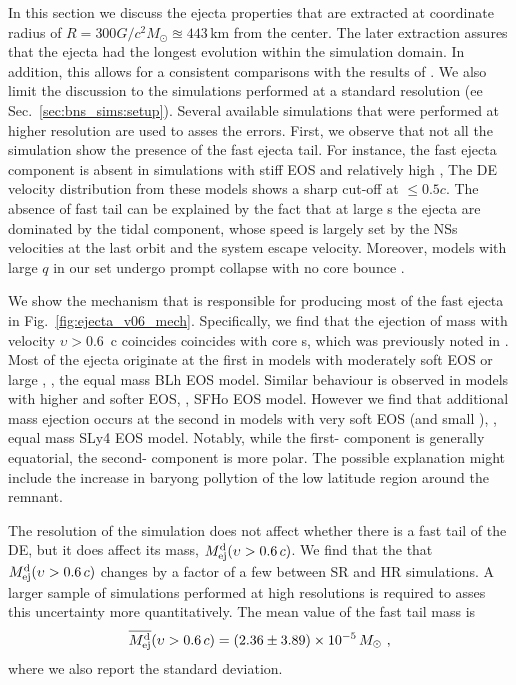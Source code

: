 In this section we discuss the ejecta properties that are extracted at 
coordinate radius of $R=300G/c^2M_{\odot}\approxeq443\,$km from the center.
The later extraction assures that the ejecta had the longest evolution 
within the simulation domain. In addition, this allows for a consistent
comparisons with the results of \citet{Radice:2018pdn}.
We also limit the discussion to the simulations performed at a standard resolution
(ee Sec.~\ref{sec:bns_sims:setup}). Several available simulations that 
were performed at higher resolution are used to asses the errors.
%
First, we observe that not all the simulation show the presence of the fast ejecta tail.
For instance, the fast ejecta component is absent in simulations with stiff \ac{EOS} 
and relatively high \mr{}, 
The \ac{DE} velocity distribution from these models shows a sharp cut-off at $\leq0.5c$.
The absence of fast tail can be explained by the fact that 
at large \mr{}s the ejecta are dominated by the tidal component, whose speed 
is largely set by the \acp{NS} velocities at the last orbit and the system escape velocity.
Moreover, models with large $q$ in our set undergo prompt collapse 
with no core bounce \citep{Bernuzzi:2020txg}.


We show the mechanism that is responsible for producing most of the fast ejecta in 
Fig.~\ref{fig:ejecta_v06_mech}. Specifically, we find that the 
ejection of mass with velocity $\upsilon>0.6$~c coincides coincides with core \bnc{}s, 
which was previously noted in \citet{Radice:2018pdn}.
Most of the ejecta originate at the first \bnc{} in models with moderately soft \ac{EOS} 
or large \mr{}, \eg, the equal mass BLh \ac{EOS} model. 
Similar behaviour is observed in models with higher \mr{} and softer \ac{EOS}, 
\eg, SFHo \ac{EOS} model.
However we find that additional mass ejection occurs at the second \bnc{} in models
with very soft \ac{EOS} (and small \mr{}), \eg, equal mass SLy4 \ac{EOS} model.
Notably, while the first-\bnc{} component is generally equatorial, the second-\bnc{} component 
is more polar. The possible explanation might include the increase in baryong pollytion
of the low latitude region around the \pmerg{} remnant.

The resolution of the simulation does not affect whether there is a fast tail 
of the \ac{DE}, but it does affect its mass, $M^{\text{d}}_{\text{ej}}(\upsilon>0.6\, c)$.
We find that the that $M^{\text{d}}_{\text{ej}}(\upsilon>0.6\, c)$ changes by a factor of a few
between SR and HR simulations.
A larger sample of simulations performed at high resolutions is required to asses this uncertainty more quantitatively.
The mean value of the fast tail mass is
\begin{equation}
    \overline{M^{\text{d}}_{\text{ej}}}(\upsilon>0.6\, c) = (2.36 \pm 3.89)\times 10^{-5}\,M_{\odot}\ ,
\end{equation}
where we also report the standard deviation.


